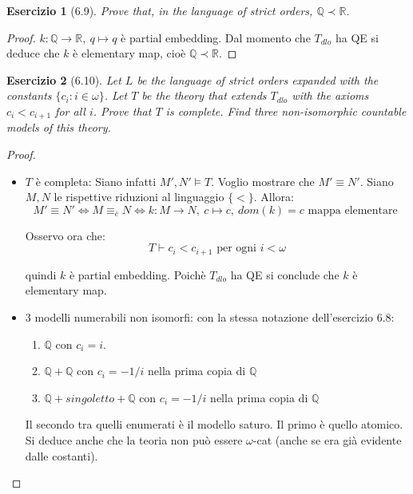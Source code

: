\documentclass{book}
\newtheorem*{esercizio}{Esercizio}
\begin{document}
\begin{esercizio}[6.9]
    Prove that, in the language of strict orders, $\mathbb{Q} \prec \mathbb{R}$.
\end{esercizio}

\begin{proof}
    $k: \mathbb{Q} \to \mathbb{R}, \ q \mapsto q$ è partial embedding. Dal momento che $T_{dlo}$ ha QE si deduce che $k$ è elementary map, cioè $\mathbb{Q} \prec \mathbb{R}$.
\end{proof}




\begin{esercizio}[6.10]
    Let $L$ be the language of strict orders expanded with the constants $\{c_i : i \in \omega\}$. Let $T$ be the theory that extends $T_{dlo}$ with the axioms $c_i < c_{i+1}$ for all $i$. Prove that $T$ is complete. Find three non-isomorphic countable models of this theory.
\end{esercizio}

\begin{proof}
    \begin{itemize}
        \item $T$ è completa: Siano infatti $M',N' \models T$. Voglio mostrare che $M' \equiv N'$. Siano $M,N$ le rispettive riduzioni al linguaggio $\{<\}$. Allora:
        \[M' \equiv N' \iff M \equiv_{\overline{c}} N \iff k:M \to N, \ c \mapsto c, \ dom(k) = c \text{ mappa elementare }\]

        Osservo ora che:
        \[
        T \vdash c_i < c_{i+1} \text{ per ogni } i<\omega
        \]

        quindi $k$ è partial embedding. 
        Poichè $T_{dlo}$ ha QE si conclude che $k$ è elementary map.

        \item $3$ modelli numerabili non isomorfi: con la stessa notazione dell'esercizio 6.8:
        \begin{enumerate}
            \item $\mathbb{Q}$ con $c_i = i$.
            \item $\mathbb{Q} + \mathbb{Q}$ con $c_i = -1/i$ nella prima copia di $\mathbb{Q}$
            \item $\mathbb{Q} + {singoletto} + \mathbb{Q}$ con $c_i = -1/i$ nella prima copia di $\mathbb{Q}$
        \end{enumerate}

        Il secondo tra quelli enumerati è il modello saturo. Il primo è quello atomico. Si deduce anche che la teoria non può essere $\omega$-cat (anche se era già evidente dalle costanti).
    \end{itemize}    
\end{proof}
\end{document}
